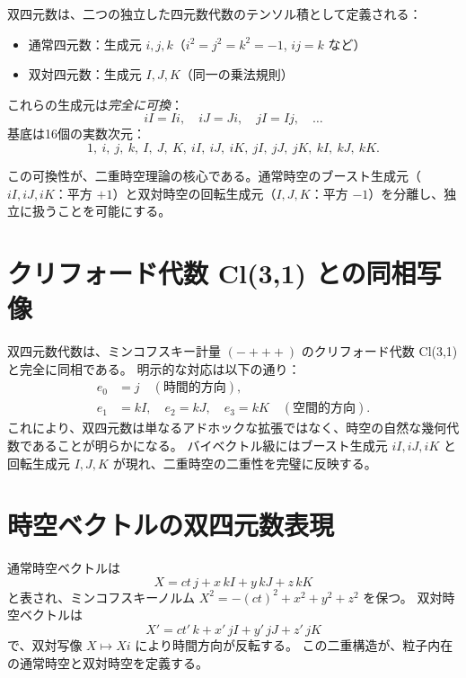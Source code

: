 \documentclass[dvipdfmx,a4paper]{jsbook}
\theoremstyle{definition}
\theoremstyle{remark}
\begin{document}
双四元数は、二つの独立した四元数代数のテンソル積として定義される：
\begin{itemize}
  \item 通常四元数：生成元 $i,j,k$（$i^2 = j^2 = k^2 = -1$, $ij=k$ など）
  \item 双対四元数：生成元 $I,J,K$（同一の乗法規則）
\end{itemize}
これらの生成元は\emph{完全に可換}：
\begin{equation}
  iI = Ii, \quad iJ = Ji, \quad jI = Ij, \quad \dots
\end{equation}
基底は16個の実数次元：
\begin{equation}
  1,\ i,\ j,\ k,\ I,\ J,\ K,\ iI,\ iJ,\ iK,\ jI,\ jJ,\ jK,\ kI,\ kJ,\ kK.
\end{equation}

この可換性が、二重時空理論の核心である。通常時空のブースト生成元（$iI,iJ,iK$：平方 $+1$）と双対時空の回転生成元（$I,J,K$：平方 $-1$）を分離し、独立に扱うことを可能にする。

\section{クリフォード代数 Cl(3,1) との同相写像}
\label{sec:clifford-isomorphism}

双四元数代数は、ミンコフスキー計量 $(-+++)$ のクリフォード代数 Cl(3,1) と完全に同相である。
明示的な対応は以下の通り：
\begin{align}
  e_0 &= j \quad (\text{時間的方向}), \\
  e_1 &= kI, \quad e_2 = kJ, \quad e_3 = kK \quad (\text{空間的方向}).
\end{align}
これにより、双四元数は単なるアドホックな拡張ではなく、時空の自然な幾何代数であることが明らかになる。
バイベクトル級にはブースト生成元 $iI,iJ,iK$ と回転生成元 $I,J,K$ が現れ、二重時空の二重性を完璧に反映する。

\section{時空ベクトルの双四元数表現}
\label{sec:spacetime-vector}

通常時空ベクトルは
\begin{equation}
  X = ct\, j + x\, kI + y\, kJ + z\, kK
\end{equation}
と表され、ミンコフスキーノルム $X^2 = -(ct)^2 + x^2 + y^2 + z^2$ を保つ。
双対時空ベクトルは
\begin{equation}
  X' = ct'\, k + x'\, jI + y'\, jJ + z'\, jK
\end{equation}
で、双対写像 $X \mapsto Xi$ により時間方向が反転する。
この二重構造が、粒子内在の通常時空と双対時空を定義する。
\end{document}
